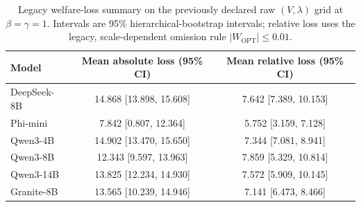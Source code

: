 \begin{table}[H]
\centering
\caption{Legacy welfare-loss summary on the previously declared raw $(V,\lambda)$ grid at $\beta=\gamma=1$. Intervals are 95\% hierarchical-bootstrap intervals; relative loss uses the legacy, scale-dependent omission rule $|W_{\mathrm{OPT}}|\leq0.01$.}
\label{tab:welfareuncertainty}
\small
\setlength{\tabcolsep}{3.5pt}
\begin{tabular}{lcc}
\toprule
Model & Mean absolute loss (95\% CI) & Mean relative loss (95\% CI) \\
\midrule
DeepSeek-8B & 14.868 [13.898, 15.608] & 7.642 [7.389, 10.153] \\
Phi-mini & 7.842 [0.807, 12.364] & 5.752 [3.159, 7.128] \\
Qwen3-4B & 14.902 [13.470, 15.650] & 7.344 [7.081, 8.941] \\
Qwen3-8B & 12.343 [9.597, 13.963] & 7.859 [5.329, 10.814] \\
Qwen3-14B & 13.825 [12.234, 14.930] & 7.572 [5.909, 10.145] \\
Granite-8B & 13.565 [10.239, 14.946] & 7.141 [6.473, 8.466] \\
\bottomrule
\end{tabular}
\end{table}
